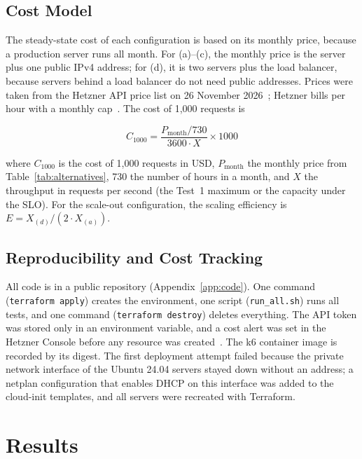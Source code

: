 \documentclass[conference,a4paper]{IEEEtran}
\begin{document}
\subsection{Cost Model}

The steady-state cost of each configuration is based on its monthly price, because a production server runs all month. For (a)--(c), the monthly price is the server plus one public IPv4 address; for (d), it is two servers plus the load balancer, because servers behind a load balancer do not need public addresses. Prices were taken from the Hetzner API price list on 26 November 2026~\cite{hz-api}; Hetzner bills per hour with a monthly cap~\cite{hz-ccx}. The cost of 1,000 requests is

\begin{equation}
C_{1000} = \frac{P_{\text{month}} / 730}{3600 \cdot X} \times 1000
\label{eq:cost}
\end{equation}

where $C_{1000}$ is the cost of 1,000 requests in USD, $P_{\text{month}}$ the monthly price from Table~\ref{tab:alternatives}, 730 the number of hours in a month, and $X$ the throughput in requests per second (the Test~1 maximum or the capacity under the SLO). For the scale-out configuration, the scaling efficiency is $E = X_{(d)} / (2 \cdot X_{(a)})$.

\subsection{Reproducibility and Cost Tracking}

All code is in a public repository (Appendix~\ref{app:code}). One command (\texttt{terraform apply}) creates the environment, one script (\texttt{run\_all.sh}) runs all tests, and one command (\texttt{terraform destroy}) deletes everything. The API token was stored only in an environment variable, and a cost alert was set in the Hetzner Console before any resource was created~\cite{hz-billing}. The k6 container image is recorded by its digest. The first deployment attempt failed because the private network interface of the Ubuntu 24.04 servers stayed down without an address; a netplan configuration that enables DHCP on this interface was added to the cloud-init templates, and all servers were recreated with Terraform.

\section{Results}
\label{sec:results}
\end{document}
